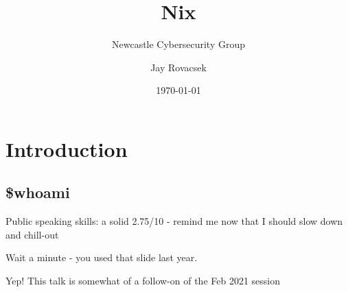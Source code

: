 \documentclass{beamer}
\title[Or how my wife started forgetting about my ability to wreck a home network]{Nix}
\subtitle{Newcastle Cybersecurity Group}
\author[Jay Rovacsek]{Jay Rovacsek}
\date{\today}
\begin{document}
\begin{frame}
    \maketitle
\end{frame}

\section{Introduction}
\subsection{\$whoami}

\begin{frame}
    \begin{center}
        Public speaking skills: a solid 2.75/10 - remind me now that I should slow down and chill-out
    \end{center}
\end{frame}

\begin{frame}
    \begin{center}
        Wait a minute - you used that slide last year.
    \end{center}
\end{frame}

\begin{frame}
    \begin{center}
        Yep! This talk is somewhat of a follow-on of the Feb 2021 session
    \end{center}
\end{frame}
\end{document}
